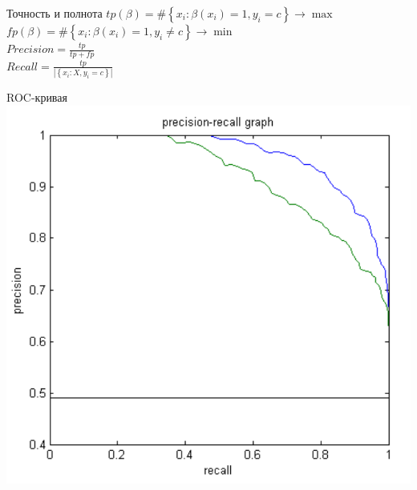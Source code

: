 \documentclass[10pt]{beamer}
\begin{document}
\begin{frame}{Точность и полнота}
	${ tp(\beta) = \# \left\{ x_i: \beta(x_i) = 1 , y_i = c \right\} \rightarrow \max  }$ 
	${ fp(\beta) = \# \left\{ x_i: \beta(x_i) = 1 , y_i \neq c \right\} \rightarrow \min}$ \\
	\bigbreak
	\pause
	$Precision = \frac{tp}{tp+fp}$\\
	\bigbreak
	$Recall = \frac{tp}{|\left\{ x_i: X , y_i = c \right\}|}$
\end{frame}

{
\begin{frame}{ROC-кривая}
  \centering
  \includegraphics[height=0.7 \textheight, keepaspectratio = true]{images/roc}   \\
\end{frame}
}
\end{document}
